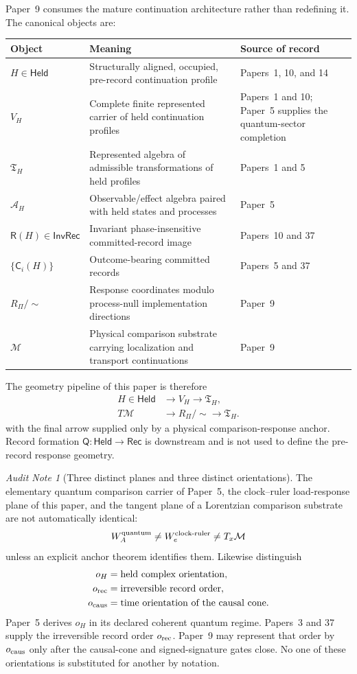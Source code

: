 \documentclass[11pt]{article}
\theoremstyle{remark}
\newtheorem{audit}[theorem]{Audit Note}
\newcommand{\Mgeom}{\mathcal M}
\newcommand{\Held}{\mathsf{Held}}
\newcommand{\Rec}{\mathsf{Rec}}
\newcommand{\VH}{V_H}
\newcommand{\Tproc}{\mathfrak T_H}
\newcommand{\AH}{\mathcal A_H}
\newcommand{\Qrec}{\mathsf Q}
\begin{document}
Paper~9 consumes the mature continuation architecture rather than redefining it.  The canonical objects are:
\begin{longtable}{p{}p{}p{}}
\toprule
Object & Meaning & Source of record \\
\midrule
$H\in\Held$ & Structurally aligned, occupied, pre-record continuation profile & Papers~1, 10, and 14 \\
$\VH$ & Complete finite represented carrier of held continuation profiles & Papers~1 and 10; Paper~5 supplies the quantum-sector completion \\
$\Tproc$ & Represented algebra of admissible transformations of held profiles & Papers~1 and 5 \\
$\AH$ & Observable/effect algebra paired with held states and processes & Paper~5 \\
$\mathsf R(H)\in\mathsf{InvRec}$ & Invariant phase-insensitive committed-record image & Papers~10 and 37 \\
$\{\mathsf C_i(H)\}$ & Outcome-bearing committed records & Papers~5 and 37 \\
$R_\Pi/\!\sim$ & Response coordinates modulo process-null implementation directions & Paper~9 \\
$\Mgeom$ & Physical comparison substrate carrying localization and transport continuations & Paper~9 \\
\bottomrule
\end{longtable}

The geometry pipeline of this paper is therefore
\[
\begin{aligned}
H\in\Held&\longrightarrow \VH\longrightarrow\Tproc,\\
T\Mgeom&\longrightarrow R_\Pi/\!\sim\longrightarrow\Tproc.
\end{aligned}
\]
with the final arrow supplied only by a physical comparison-response anchor.  Record formation $\Qrec:\Held\to\Rec$ is downstream and is not used to define the pre-record response geometry.

\begin{audit}[Three distinct planes and three distinct orientations]
The elementary quantum comparison carrier of Paper~5, the clock--ruler load-response plane of this paper, and the tangent plane of a Lorentzian comparison substrate are not automatically identical:
\[
W_A^{\rm quantum}\neq W_e^{\rm clock\text{-}ruler}\neq T_x\Mgeom
\]
unless an explicit anchor theorem identifies them.  Likewise distinguish
\[
\begin{aligned}
o_H&=\text{held complex orientation},\\
o_{\rm rec}&=\text{irreversible record order},\\
o_{\rm caus}&=\text{time orientation of the causal cone}.
\end{aligned}
\]
Paper~5 derives $o_H$ in its declared coherent quantum regime.  Papers~3 and 37 supply the irreversible record order $o_{\rm rec}$.  Paper~9 may represent that order by $o_{\rm caus}$ only after the causal-cone and signed-signature gates close.  No one of these orientations is substituted for another by notation.
\end{audit}
\end{document}
